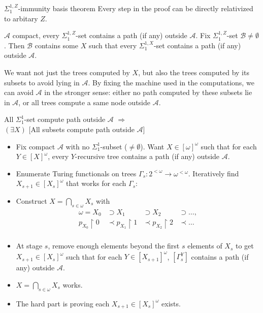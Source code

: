 \begin{frame}{$\Sigma_1^{1,Z}$-immunity basis theorem}
  Every step in the proof can be directly relativized to arbitary $Z$.
  \vspace{0.5em}
  \begin{thm}
    $\mathcal{A}$ compact, every $\Sigma_1^{1,Z}$-set contains a path
    (if any) outside $\mathcal{A}$. Fix $\Sigma_1^{1,Z}$-set
    $\mathcal{B}\neq\emptyset$. Then $\mathcal{B}$ contains some $X$ such
    that every $\Sigma_1^{1,X}$-set contains a path (if any) outside
    $\mathcal{A}$.
  \end{thm}

  \vspace{1em}
  We want not just the trees computed by $X$, but also the trees computed
  by its subsets to avoid lying in $\mathcal{A}$. By fixing the machine
  used in the computations, we can avoid $\mathcal{A}$ in the stronger
  sense: either no path computed by these subsets lie in $\mathcal{A}$, or
  all trees compute a same node outside $\mathcal{A}$.
\end{frame}

\begin{frame}{All $\Sigma_1^1$-set compute path outside $\mathcal{A}$
$\Rightarrow$\\ $(\exists X)$ {[All subsets compute path outside
$\mathcal{A}$]}}
  \begin{itemize}
    \item Fix compact $\mathcal{A}$ with no $\Sigma_1^1$-subset
      ($\neq\emptyset$). Want $X\in[\omega]^\omega$ such that for each
      $Y\in[X]^\omega$, every $Y$-recursive tree contains a path (if any)
      outside $\mathcal{A}$.
    \item Enumerate Turing functionals on trees
      $\Gamma_s:2^{<\omega} \rightarrow \omega^{<\omega}$. Iteratively
      find $X_{s+1}\in[X_s]^\omega$ that works for each $\Gamma_s$:
    \item Construct $X=\bigcap_{s\in\omega}X_s$ with
      \[\begin{array}{rlll}
        \omega=X_0 &\supset X_1 &\supset X_2 &\supset\ldots,\\
        p_{X_0}\restriction0 &\prec p_{X_1}\restriction1 &\prec
          p_{X_2}\restriction2 &\prec\ldots\\
      \end{array}\]
    \item At stage $s$, remove enough elements beyond the first $s$
      elements of $X_s$ to get $X_{s+1}\in[X_s]^\omega$ such that for each
      $Y\in[X_{s+1}]^\omega$, $[\Gamma_s^Y]$
      contains a path (if any) outside $\mathcal{A}$.
    \item $X=\bigcap_{s\in\omega}X_s$ works.
    \item The hard part is proving each $X_{s+1}\in[X_s]^\omega$ exists.
  \end{itemize}
\end{frame}

